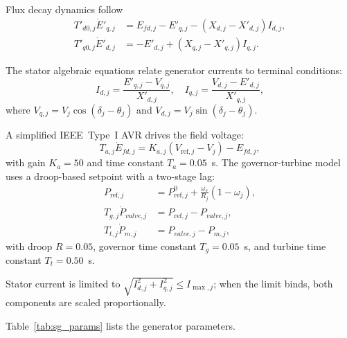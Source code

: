 \documentclass[11pt]{article}
\begin{document}
Flux decay dynamics follow
\begin{align}
  T'_{d0,j} \dot{E}'_{q,j} &= E_{fd,j} - E'_{q,j}
    - (X_{d,j} - X'_{d,j}) I_{d,j}, \label{eq:eqp} \\
  T'_{q0,j} \dot{E}'_{d,j} &= -E'_{d,j}
    + (X_{q,j} - X'_{q,j}) I_{q,j}. \label{eq:edp}
\end{align}

The stator algebraic equations relate generator currents to terminal
conditions:
\begin{equation}
  I_{d,j} = \frac{E'_{q,j} - V_{q,j}}{X'_{d,j}}, \quad
  I_{q,j} = \frac{V_{d,j} - E'_{d,j}}{X'_{q,j}},
  \label{eq:stator}
\end{equation}
where $V_{q,j} = V_j \cos(\delta_j - \theta_j)$ and
$V_{d,j} = V_j \sin(\delta_j - \theta_j)$.

A simplified IEEE~Type~I AVR drives the field voltage:
\begin{equation}
  T_{a,j} \dot{E}_{fd,j} = K_{a,j}(V_{\mathrm{ref},j} - V_j)
    - E_{fd,j},
  \label{eq:avr}
\end{equation}
with gain $K_a = 50$ and time constant $T_a = 0.05$~s.  The
governor-turbine model uses a droop-based setpoint with a two-stage
lag:
\begin{align}
  P_{\mathrm{ref},j} &= P_{\mathrm{ref},j}^0
    + \frac{\omega_s}{R_j}(1 - \omega_j), \label{eq:droop} \\
  T_{g,j} \dot{P}_{valve,j} &= P_{\mathrm{ref},j} - P_{valve,j},
    \label{eq:gov} \\
  T_{t,j} \dot{P}_{m,j} &= P_{valve,j} - P_{m,j},
    \label{eq:turb}
\end{align}
with droop $R = 0.05$, governor time constant $T_g = 0.05$~s, and
turbine time constant $T_t = 0.50$~s.

Stator current is limited to
$\sqrt{I_{d,j}^2 + I_{q,j}^2} \leq I_{\max,j}$; when the limit
binds, both components are scaled proportionally.

Table~\ref{tab:sg_params} lists the generator parameters.
\end{document}
